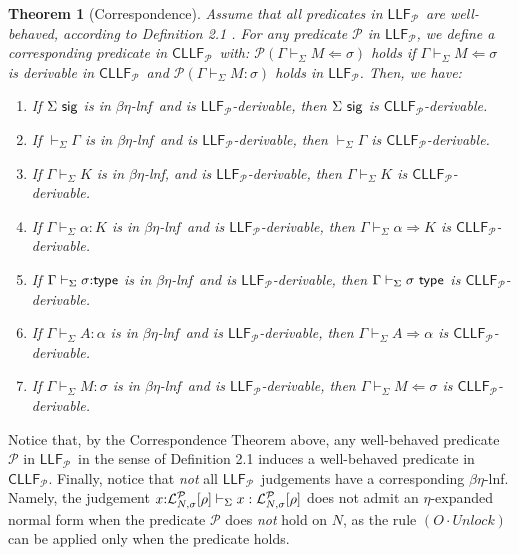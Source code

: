 \documentclass[submission,copyright,creativecommons]{eptcs}
\theoremstyle{plain}
\newtheorem{theorem}{Theorem}[section]
\theoremstyle{definition}
\newcommand{\LLFP}  {\mbox{$\mathsf{LLF}_{\mathcal P}$}}
\newcommand{\CLLFP} {\mbox{$\mathsf{CLLF}_{\mathcal P}$}}
\newcommand {\Lock}   [4] {{\mathcal{L}}^{#1}_{#2, #3}[{#4}]} \newcommand {\LockC} [3] {{\mathcal{L}}^{#1}_{#2}      [{#3}]}
\newcommand {\VDASHS} {\vdash_\Sigma} \newcommand {\VDASHO} {\vdash_\Omega} \newcommand {\VDASHCBV} {\vdash_{\Sigma_{{CBV}}}} \newcommand {\VDASHSIMP} {\vdash_{\Sigma_{{Imp}}}} \newcommand {\VDASHSHOARE} {\vdash_{\Sigma_{{Hoare}}}} \newcommand {\VDASHSERASE} {\vdash_{\Sigma^\Erase}}    \newcommand {\VDASHEAL} {\vdash_{EAL}} \newcommand {\VDASHSEAL} {\vdash_{\Sigma_{{EAL}}}} \newcommand {\VDASHFP} {\vdash_{\sf FPST}}
\renewcommand {\P} {\mathcal{P}} \newcommand {\Q} {\mathcal{Q}}
\renewcommand {\L} {\mathcal{L}} \newcommand   {\C} {\mathcal{C}} \newcommand   {\T} {\mathcal{T}} \newcommand   {\U} {\mathcal{U}}
\newcommand {\ELNF}  {$\beta\eta$-lnf}   \newcommand {\Subst} {{\mathcal S}}
\newcommand{\up}[1]   {\vspace{-#1mm}}
\newcommand{\Erase} {{-\U\L}}
\begin{document}
\begin{theorem}[Correspondence]\label{thm:correspond} Assume that all
  predicates in \LLFP\ are well-behaved, according to Definition 2.1
  \cite{HLLMSJ12}. For any predicate $\P$ in \LLFP, we define a
  corresponding predicate in \CLLFP\ with:
  $\P (\Gamma \VDASHS M\Leftarrow \sigma)$ holds if
  $\Gamma \VDASHS M\Leftarrow \sigma$ is derivable in \CLLFP\ and
  $\P (\Gamma \VDASHS M : \sigma)$ holds in \LLFP. Then, we
  have:\vspace{-0.5ex}

  \begin{enumerate}
  \setlength\itemsep{-0.3ex}
\item If $ \Sigma\ {\mathsf {sig}}$ is in \ELNF\ and is \LLFP-derivable, then
  $\Sigma \ {\mathsf {sig}}$ is \CLLFP-derivable.
\item If $\VDASHS \Gamma$ is in \ELNF\ and is \LLFP-derivable, then
  $\VDASHS \Gamma$ is \CLLFP-derivable.
\item If $\Gamma \VDASHS K$ is in \ELNF, and is \LLFP-derivable, then
  $\Gamma \VDASHS K$ is \CLLFP-derivable.
\item If $\Gamma \VDASHS \alpha : K$ is in \ELNF\ and is \LLFP-derivable, then
  $\Gamma \VDASHS \alpha \Rightarrow K$ is \CLLFP-derivable.
\item If $\Gamma \VDASHS \sigma \of \Type$ is in \ELNF\ and is
  \LLFP-derivable, then $\Gamma \VDASHS \sigma \ \Type$ is
  \CLLFP-derivable.
\item If $\Gamma \VDASHS A : \alpha$ is in \ELNF\ and is \LLFP-derivable, then
  $\Gamma \VDASHS A \Rightarrow \alpha$ is \CLLFP-derivable.
  \item If $\Gamma \VDASHS M : \sigma$ is in \ELNF\ and is
    \LLFP-derivable, then $\Gamma \VDASHS M \Leftarrow \sigma$ is
    \CLLFP-derivable.
  \end{enumerate}
\end{theorem}
Notice that, by the Correspondence Theorem above, any well-behaved
predicate $\P$ in \LLFP\, in the sense of Definition 2.1
\cite{HLLMSJ12} induces a well-behaved predicate in \CLLFP. Finally,
notice that \emph{not} all \LLFP\ judgements have a corresponding
\ELNF. Namely, the judgement
$x\of \Lock{\P}{N}{\sigma}{\rho} \VDASHS x :
\Lock{\P}{N}{\sigma}{\rho}$
does not admit an $\eta$-expanded normal form when the predicate $\P$
does \emph{not} hold on $N$, as the rule $(O{\cdot}Unlock)$ can be
applied only when the predicate holds.

\up{1.5}
\end{document}
